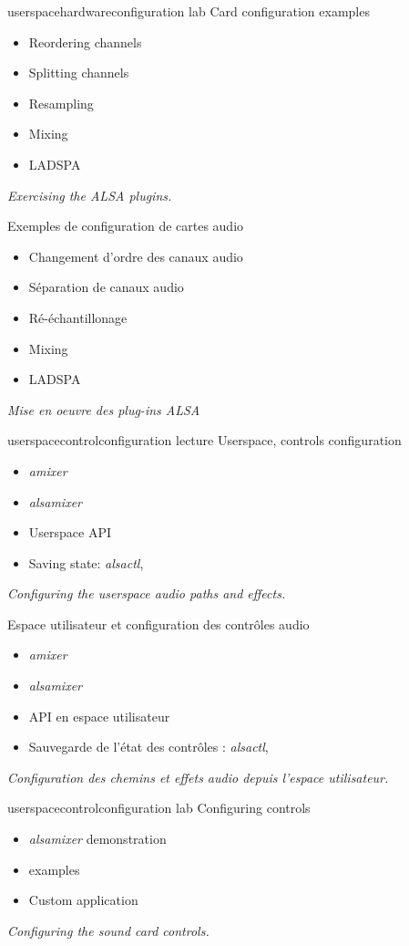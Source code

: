 {userspacehardwareconfiguration}
{lab}
{Card configuration examples}
{
  \begin{itemize}
  \item Reordering channels
  \item Splitting channels
  \item Resampling
  \item Mixing
  \item LADSPA
  \end{itemize}
  \vspace{0.5em}
  {\em Exercising the ALSA plugins.}
}
{Exemples de configuration de cartes audio}
{
  \begin{itemize}
  \item Changement d'ordre des canaux audio
  \item Séparation de canaux audio
  \item Ré-échantillonage
  \item Mixing
  \item LADSPA
  \end{itemize}
  \vspace{0.5em}
  {\em Mise en oeuvre des plug-ins ALSA}
}
{userspacecontrolconfiguration}
{lecture}
{Userspace, controls configuration}
{
  \begin{itemize}
  \item {\em amixer}
  \item {\em alsamixer}
  \item Userspace API
  \item Saving state: {\em alsactl}, 
  \end{itemize}
  \vspace{0.5em}
  {\em Configuring the userspace audio paths and effects.}
}
{Espace utilisateur et configuration des contrôles audio}
{
  \begin{itemize}
  \item {\em amixer}
  \item {\em alsamixer}
  \item API en espace utilisateur
  \item Sauvegarde de l'état des contrôles : {\em alsactl}, 
  \end{itemize}
  \vspace{0.5em}
  {\em Configuration des chemins et effets audio depuis l'espace utilisateur.}
}
{userspacecontrolconfiguration}
{lab}
{Configuring controls}
{
  \begin{itemize}
  \item {\em alsamixer} demonstration
  \item {} examples
  \item Custom application
  \end{itemize}
  \vspace{0.5em}
  {\em Configuring the sound card controls.}
}
